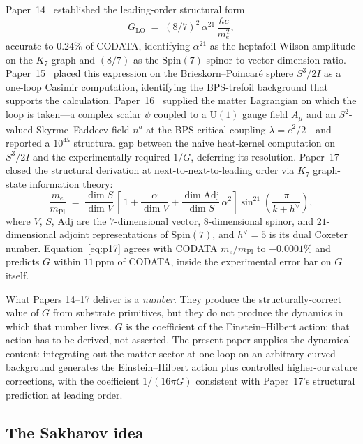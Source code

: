 \documentclass[11pt]{article}
\newcommand{\Adj}{\mathrm{Adj}}
\newcommand{\mPl}{m_{\mathrm{Pl}}}
\newcommand{\me}{m_e}
\newcommand{\hv}{h^{\vee}}
\newcommand{\U}{\mathrm{U}}
\begin{document}
Paper~14~\cite{paper14} established the leading-order structural
form
\begin{equation}
  G_{\mathrm{LO}} \;=\; (8/7)^2\,\alpha^{21}\,\frac{\hbar c}{\me^2},
  \label{eq:p14-LO}
\end{equation}
accurate to $0.24\%$ of CODATA, identifying $\alpha^{21}$ as the
heptafoil Wilson amplitude on the $K_7$ graph and $(8/7)$ as the
$\mathrm{Spin}(7)$ spinor-to-vector dimension ratio.
Paper~15~\cite{paper15} placed this expression on the
Brieskorn--Poincar\'e sphere $S^3/2I$ as a one-loop Casimir
computation, identifying the BPS-trefoil background that supports
the calculation.  Paper~16~\cite{paper16} supplied the matter
Lagrangian on which the loop is taken---a complex scalar $\psi$
coupled to a $\U(1)$ gauge field $A_\mu$ and an $S^2$-valued
Skyrme--Faddeev field $n^a$ at the BPS critical coupling
$\lambda = e^2/2$---and reported a $10^{45}$ structural gap
between the naive heat-kernel computation on $S^3/2I$ and the
experimentally required $1/G$, deferring its resolution.
Paper~17~\cite{paper17} closed the structural derivation at
next-to-next-to-leading order via $K_7$ graph-state information
theory:
\begin{equation}
  \frac{\me}{\mPl}
    \;=\;
    \frac{\dim S}{\dim V}\,
    \left[\, 1
      + \frac{\alpha}{\dim V}
      + \frac{\dim \Adj}{\dim S}\,\alpha^2
    \right]
    \sin^{21}\!\left(\frac{\pi}{k + \hv}\right),
  \label{eq:p17}
\end{equation}
where $V$, $S$, $\Adj$ are the $7$-dimensional vector,
$8$-dimensional spinor, and $21$-dimensional adjoint representations
of $\mathrm{Spin}(7)$, and $\hv = 5$ is its dual Coxeter number.
Equation~\eqref{eq:p17} agrees with CODATA $\me/\mPl$ to $-0.0001\%$
and predicts $G$ within $11$\,ppm of CODATA, inside the experimental
error bar on $G$ itself.

What Papers 14--17 deliver is a \emph{number}.  They produce the
structurally-correct value of $G$ from substrate primitives, but
they do not produce the dynamics in which that number lives.
$G$ is the coefficient of the Einstein--Hilbert action; that action
has to be derived, not asserted.  The present paper supplies the
dynamical content: integrating out the matter sector at one loop on
an arbitrary curved background generates the Einstein--Hilbert
action plus controlled higher-curvature corrections, with the
coefficient $1/(16\pi G)$ consistent with Paper~17's structural
prediction at leading order.

\subsection{The Sakharov idea}
\end{document}
